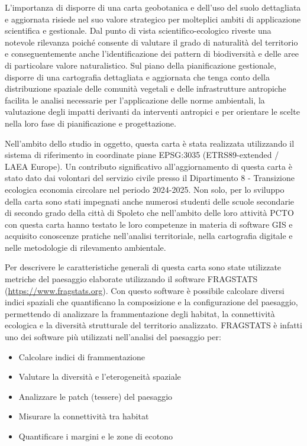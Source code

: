 \documentclass[
]{book}
\providecommand{\tightlist}{%
  \setlength{\itemsep}{0pt}\setlength{\parskip}{0pt}}
\begin{document}
L'importanza di disporre di una carta geobotanica e dell'uso del suolo dettagliata e aggiornata risiede nel suo valore strategico per molteplici ambiti di applicazione scientifica e gestionale.
Dal punto di vista scientifico-ecologico riveste una notevole rilevanza poiché consente di valutare il grado di naturalità del territorio e conseguentemente anche l'identificazione dei pattern di biodiversità e delle aree di particolare valore naturalistico.
Sul piano della pianificazione gestionale, disporre di una cartografia dettagliata e aggiornata che tenga conto della distribuzione spaziale delle comunità vegetali e delle infrastrutture antropiche facilita le analisi necessarie per l'applicazione delle norme ambientali, la valutazione degli impatti derivanti da interventi antropici e per orientare le scelte nella loro fase di pianificazione e progettazione.

Nell'ambito dello studio in oggetto, questa carta è stata realizzata utilizzando il sistema di riferimento in coordinate piane EPSG:3035 (ETRS89-extended / LAEA Europe).
Un contributo significativo all'aggiornamento di questa carta è stato dato dai volontari del servizio civile presso il Dipartimento 8 - Transizione ecologica economia circolare nel periodo 2024-2025.
Non solo, per lo sviluppo della carta sono stati impegnati anche numerosi studenti delle scuole secondarie di secondo grado della città di Spoleto che nell'ambito delle loro attività PCTO con questa carta hanno testato le loro competenze in materia di software GIS e acquisito conoscenze pratiche nell'analisi territoriale, nella cartografia digitale e nelle metodologie di rilevamento ambientale.

Per descrivere le caratteristiche generali di questa carta sono state utilizzate metriche del paesaggio elaborate utilizzando il software FRAGSTATS (\url{https://www.fragstats.org})\citep{mcgarigalFragstatHelp2015}.
Con questo software è possibile calcolare diversi indici spaziali che quantificano la composizione e la configurazione del paesaggio, permettendo di analizzare la frammentazione degli habitat, la connettività ecologica e la diversità strutturale del territorio analizzato.
FRAGSTATS è infatti uno dei software più utilizzati nell'analisi del paesaggio per:

\begin{itemize}
\tightlist
\item
  Calcolare indici di frammentazione
\item
  Valutare la diversità e l'eterogeneità spaziale
\item
  Analizzare le patch (tessere) del paesaggio
\item
  Misurare la connettività tra habitat
\item
  Quantificare i margini e le zone di ecotono
\end{itemize}
\end{document}
